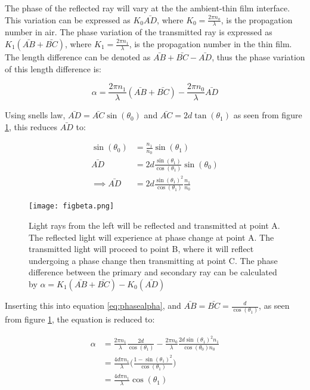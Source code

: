 \documentclass[MasterThesisMain.tex]{subfiles}
\begin{document}
The phase of the reflected ray will vary at the the ambient-thin film interface. This variation can be expressed as $K_0\bar{AD}$, where $K_0=\frac{2\pi n_o}{\lambda}$, is the propagation number in air. The phase variation of the transmitted ray is expressed as $K_1(\bar{AB} + \bar{BC})$, where $K_1=\frac{2\pi n_1}{\lambda}$, is the propagation number in the thin film. The length difference can be denoted as $\bar{AB} + \bar{BC} - \bar{AD}$, thus the phase variation of this length difference is:

\begin{equation}\label{eq:phasealpha}
\alpha = \frac{2\pi n_1}{\lambda}(\bar{AB} + \bar{BC}) - \frac{2\pi n_0}{\lambda}\bar{AD}
\end{equation}

Using snells law, $\bar{AD}=\bar{AC}\sin(\theta_0)$ and $\bar{AC}=2d\tan(\theta_1)$ as seen from figure \ref{fig:beta}, this reduces $\bar{AD}$ to:


\begin{align}
\sin(\theta_0) &= \frac{n_1}{n_0}\sin(\theta_1)\\
\bar{AD}&= 2d\frac{\sin(\theta_1)}{\cos(\theta_1)}\sin(\theta_0)\\
\implies \bar{AD}&= 2d\frac{\sin(\theta_1)^2}{\cos(\theta_1)}\frac{n_1}{n_0}
\end{align}


\begin{figure}
\centering
\texttt{[image: figbeta.png]}
\caption{Light rays from the left will be reflected and transmitted at point A. The reflected light will experience at phase change at point A. The transmitted light will proceed to point B, where it will reflect undergoing a phase change then transmitting at point C. The phase difference between the primary and secondary ray can be calculated by $\alpha = K_1(\bar{AB}+\bar{BC})-K_0(\bar{AD})$}
\label{fig:beta}
\end{figure}  

Inserting this into equation \ref{eq:phasealpha}, and $\bar{AB}=\bar{BC}=\frac{d}{\cos(\theta_1)}$, as seen from figure \ref{fig:beta}, the equation is reduced to:

\begin{align}
\alpha &= \frac{2\pi n_1}{\lambda}\frac{2d}{\cos(\theta_1)}-\frac{2\pi n_0}{\lambda}\frac{2d \sin(\theta_1)^2n_1}{\cos(\theta_0)n_0}\\
&= \frac{4d\pi n_1}{\lambda}\bigg(\frac{1-\sin(\theta_1)^2}{\cos(\theta_1)}\bigg)\\
&= \frac{4d\pi n_1}{\lambda}\cos(\theta_1)
\end{align}
\end{document}
